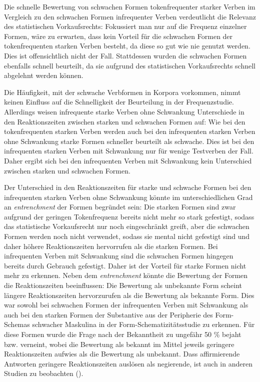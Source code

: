 Die schnelle Bewertung von schwachen Formen tokenfrequenter starker Verben im Vergleich zu den schwachen Formen infrequenter Verben verdeutlicht die Relevanz des statistischen Vorkaufsrechts: Fokussiert man nur auf die Frequenz einzelner Formen, wäre zu erwarten, dass kein Vorteil für die schwachen Formen der tokenfrequenten starken Verben besteht, da diese so gut wie nie genutzt werden. Dies ist offensichtlich nicht der Fall. Stattdessen wurden die schwachen Formen ebenfalls schnell beurteilt, da sie aufgrund des statistischen Vorkaufsrechts schnell abgelehnt werden können. 

Die Häufigkeit, mit der schwache Verbformen in Korpora vorkommen, nimmt keinen Einfluss auf die Schnelligkeit der Beurteilung in der Frequenzstudie. Allerdings weisen infrequente starke Verben ohne Schwankung  Unterschiede in den Reaktionszeiten zwischen starken und schwachen Formen auf: Wie bei den tokenfrequenten starken Verben werden auch bei den infrequenten starken Verben ohne Schwankung starke Formen schneller beurteilt als schwache. Dies ist bei den infrequenten starken Verben mit Schwankung nur für wenige Testverben der Fall. Daher ergibt sich bei den infrequenten Verben mit Schwankung kein Unterschied zwischen starken und schwachen Formen.\largerpage

Der Unterschied in den Reaktionszeiten für starke und schwache Formen bei den infrequenten starken Verben ohne Schwankung könnte im unterschiedlichen Grad an \textit{entrenchment} der Formen begründet sein: Die starken Formen sind zwar aufgrund der geringen Tokenfrequenz bereits nicht mehr so stark gefestigt, sodass das statistische Vorkaufsrecht nur noch eingeschränkt greift, aber die schwachen Formen werden noch nicht verwendet, sodass sie mental nicht gefestigt sind und daher höhere Reaktionszeiten hervorrufen als die starken Formen. Bei infrequenten Verben mit Schwankung sind die schwachen Formen hingegen bereits durch Gebrauch gefestigt. Daher ist der Vorteil für starke Formen nicht mehr zu erkennen. Neben dem \textit{entrenchment} könnte die Bewertung der Formen die Reaktionszeiten beeinflussen: Die Bewertung als unbekannte Form scheint längere Reaktionszeiten hervorzurufen als die Bewertung als bekannte Form. Dies war sowohl bei schwachen Formen der infrequenten Verben mit Schwankung als auch bei den starken Formen der Substantive aus der Peripherie des Form-Schemas schwacher Maskulina in der Form-Schematizitätsstudie zu erkennen. Für diese Formen wurde die Frage nach der Bekanntheit zu ungefähr 50 \% bejaht bzw. verneint, wobei die Bewertung als bekannt im Mittel jeweils geringere Reak\-tionszeiten aufwies als die Bewertung als unbekannt. Dass affirmierende Antworten geringere Reak\-tionszeiten auslösen als negierende, ist auch in anderen Studien zu beobachten (\cite[282--283]{Wegge.2001}).


